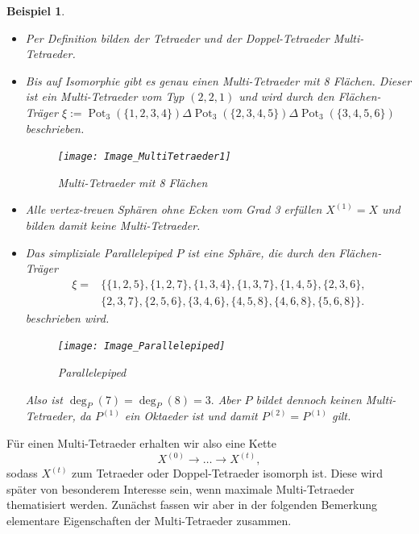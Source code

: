 \documentclass[12pt,titlepage,twoside,cleardoublepage]{article}
\theoremstyle{nummermitklammern}
\newtheorem{bsp}[temp]{Beispiel}
\newtheorem{bsp}[zahl]{Beispiel}
\numberwithin{equation}{section}
\DeclareMathOperator{\Pot}{Pot}
\begin{document}
\begin{bsp} \label{bspCactus}
\begin{itemize}
\item Per Definition bilden der Tetraeder und der Doppel-Tetraeder Multi-Tetraeder.
\item Bis auf Isomorphie gibt es genau einen Multi-Tetraeder mit 8 Flächen. Dieser ist ein Multi-Tetraeder vom Typ $(2,2,1)$ und wird durch den Flächen-Träger $\xi:=\Pot_3(\{1,2,3,4\})\Delta \Pot_3(\{2,3,4,5\})\Delta \Pot_3(\{3,4,5,6\})$ beschrieben. 
\begin{figure}[H]
\begin{center}
\texttt{[image: Image\_MultiTetraeder1]}
\end{center}
\caption{Multi-Tetraeder mit 8 Flächen}
\end{figure}
\item Alle vertex-treuen Sphären ohne Ecken vom Grad 3 erfüllen $X^{(1)}=X$ und bilden damit keine Multi-Tetraeder.
\item Das simpliziale Parallelepiped $P$ ist eine Sphäre, die durch den Flächen-Träger  
\begin{align*}
\xi=&\{ \{1, 2, 5 \}, \{ 1, 2, 7 \}, \{ 1, 3, 4 \}, \{ 1, 3, 7 \}, \{ 1, 4, 5 \},\{ 2, 3, 6 \},\\ &\{2, 3, 7 \}, 
\{ 2, 5, 6 \}, \{ 3, 4, 6 \}, \{ 4, 5, 8 \},\{ 4, 6, 8 \}, \{ 5, 6, 8 \} \}.
\end{align*}
beschrieben wird.
\begin{figure}[H]
\begin{center}
\texttt{[image: Image\_Parallelepiped]}
\end{center}
\caption{Parallelepiped}
\end{figure}
Also ist $\deg_P(7)=\deg_P(8)=3.$ Aber $P$ bildet dennoch keinen Multi-Tetraeder, da $P^{(1)}$ ein Oktaeder ist und damit $P^{(2)}=P^{(1)}$ gilt.
\end{itemize}
\end{bsp}
Für einen Multi-Tetraeder erhalten wir also eine Kette 
\[
X^{(0)}\to \ldots \to X^{(t)},
\] 
sodass $X^{(t)}$ zum Tetraeder oder Doppel-Tetraeder isomorph ist.
Diese wird später von besonderem Interesse sein, wenn maximale Multi-Tetraeder thematisiert werden. Zunächst fassen wir aber in der folgenden Bemerkung elementare Eigenschaften der Multi-Tetraeder zusammen.
\end{document}
